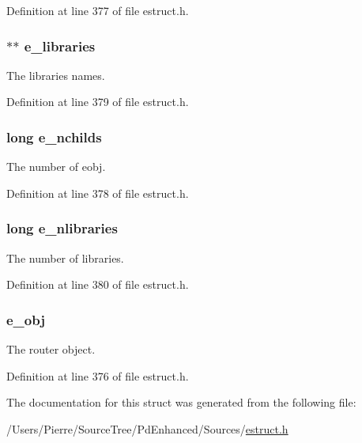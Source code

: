 Definition at line 377 of file estruct.\-h.

\hypertarget{struct__erouter_ad4cb6c25f09dfe6806fde606969accd5}{
\subsubsection[{e\-\_\-libraries}]{$\ast$$\ast$ e\-\_\-libraries}}\label{struct__erouter_ad4cb6c25f09dfe6806fde606969accd5}
The libraries names. 

Definition at line 379 of file estruct.\-h.

\hypertarget{struct__erouter_aae6cef9e2d4de46e690ad868953d0923}{
\subsubsection[{e\-\_\-nchilds}]{\setlength{\rightskip}{0pt plus 5cm}long e\-\_\-nchilds}}\label{struct__erouter_aae6cef9e2d4de46e690ad868953d0923}
The number of eobj. 

Definition at line 378 of file estruct.\-h.

\hypertarget{struct__erouter_a8b3fb033a6ba10fb08f5353a71dec2c7}{
\subsubsection[{e\-\_\-nlibraries}]{\setlength{\rightskip}{0pt plus 5cm}long e\-\_\-nlibraries}}\label{struct__erouter_a8b3fb033a6ba10fb08f5353a71dec2c7}
The number of libraries. 

Definition at line 380 of file estruct.\-h.

\hypertarget{struct__erouter_a337dd8dd1771ebe57e90886d4fdfe92d}{
\subsubsection[{e\-\_\-obj}]{ e\-\_\-obj}}\label{struct__erouter_a337dd8dd1771ebe57e90886d4fdfe92d}
The router object. 

Definition at line 376 of file estruct.\-h.



The documentation for this struct was generated from the following file\-:\begin{DoxyCompactItemize}
\item 
/\-Users/\-Pierre/\-Source\-Tree/\-Pd\-Enhanced/\-Sources/\hyperlink{estruct_8h}{estruct.\-h}\end{DoxyCompactItemize}

